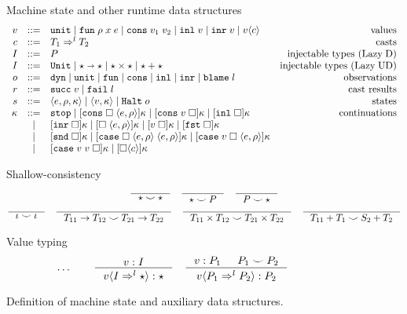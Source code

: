\documentclass[acmsmall,review,anonymous]{acmart}\settopmatter{printfolios=true,printccs=false,printacmref=false}
\newcommand{\stxrule}[3]{#1 & ::= & #3 & \text{#2}\\}
\newcommand{\stxrulecont}[1]{& | & #1 & \\}
\newcommand{\plus}[0]{+}
\newcommand{\lazyUD}{Lazy\;UD}
\newcommand{\lazyD}{Lazy\;D}
\newcommand{\sOOinspect}[3]{\langle#1,#2,#3\rangle}
\newcommand{\sOOreturn}[2]{\langle#1,#2\rangle}
\newcommand{\sOOhalt}[1]{\mathtt{Halt} \; #1}
\newcommand{\TOOdyn}[0]{\star}
\newcommand{\POOunit}[0]{\mathtt{Unit}}
\newcommand{\POOfun}[2]{#1 \shortrightarrow #2}
\newcommand{\cOOcast}[3]{#1 \Rightarrow^{#2} #3}
\newcommand{\oOOinj}{\mathtt{dyn}}
\newcommand{\oOOsole}{\mathtt{unit}}
\newcommand{\oOOfun}{\mathtt{fun}}
\newcommand{\oOOcons}{\mathtt{cons}}
\newcommand{\oOOinl}{\mathtt{inl}}
\newcommand{\oOOinr}{\mathtt{inr}}
\newcommand{\oOOblame}[1]{\mathtt{blame} \; #1}
\newcommand{\vOOcast}[2]{#1\langle#2\rangle}
\newcommand{\vOOfun}[3]{\mathtt{fun} \; #1 \; #2 \; #3}
\newcommand{\vOOtt}[0]{\mathtt{unit}}
\newcommand{\vOOcons}[2]{\mathtt{cons}\;#1\;#2}
\newcommand{\vOOinl}[1]{\mathtt{inl}\;#1}
\newcommand{\vOOinr}[1]{\mathtt{inr}\;#1}
\newcommand{\rOOsucc}[1]{\mathtt{succ}\;#1}
\newcommand{\rOOfail}[1]{\mathtt{fail}\;#1}
\newcommand{\kOOmt}[0]{\mathtt{stop}}
\newcommand{\kOOconsI}[3]{[\mathtt{cons} \; \square \; \langle#1,#2\rangle ]#3}
\newcommand{\kOOconsII}[2]{[\mathtt{cons} \; #1 \; \square]#2}
\newcommand{\kOOinl}[1]{[\mathtt{inl}\; \square]#1}
\newcommand{\kOOinr}[1]{[\mathtt{inr}\; \square]#1}
\newcommand{\kOOappI}[3]{
  [\square \; \langle#1,#2\rangle]#3
}
\newcommand{\kOOappII}[2]{
  [#1 \; \square]#2}
\newcommand{\kOOcar}[1]{[\mathtt{fst} \; \square]#1}
\newcommand{\kOOcdr}[1]{[\mathtt{snd} \; \square]#1}
\newcommand{\kOOcaseI}[4]{
  [\mathtt{case} \; \square \; \langle#1,#3\rangle \; \langle#2,#3\rangle ]#4}
\newcommand{\kOOcaseII}[4]{
  [\mathtt{case} \; #1 \; \square \; \langle#2,#3\rangle ]#4}
\newcommand{\kOOcaseIII}[3]{
  [\mathtt{case} \; #1 \; #2 \; \square]#3}
\newcommand{\kOOcast}[2]{
  [\square \langle #1 \rangle]#2}
\begin{document}
\begin{figure}
  Machine state and other runtime data structures
  \[
  \begin{array}{rclr}
  \stxrule{v}{values}{
    \vOOtt{} \mid
    \vOOfun{\rho}{x}{e} \mid
    \vOOcons{v_1}{v_2} \mid
    \vOOinl{v} \mid
    \vOOinr{v} \mid   
    \vOOcast{v}{c}
  }
  \stxrule{c}{casts}{
    \cOOcast{T_1}{l}{T_2}
  }
  \stxrule{I}{injectable types (\lazyD)}{
    P
  }
  \stxrule{I}{injectable types (\lazyUD)}{
    \POOunit \mid
    \POOfun{\star}{\star} \mid
    \star \times \star \mid
    \star + \star
  }
  \stxrule{o}{observations}{
    \oOOinj \mid
    \oOOsole \mid
    \oOOfun \mid
    \oOOcons \mid
    \oOOinl \mid
    \oOOinr \mid
    \oOOblame{l}
  }
  \stxrule{r}{cast results}{
    \rOOsucc{v} \mid
    \rOOfail{l}
  }
  \stxrule{s}{states}{
    \sOOinspect{e}{\rho}{\kappa} \mid{}
    \sOOreturn{v}{\kappa} \mid{}
    \sOOhalt{o}
  }
  \stxrule{\kappa}{continuations}{
    \kOOmt \mid
    \kOOconsI{e}{\rho}{\kappa} \mid
    \kOOconsII{v}{\kappa} \mid
    \kOOinl{\kappa}
  }
  \stxrulecont{
    \kOOinr{\kappa} \mid
    \kOOappI{e}{\rho}{\kappa} \mid
    \kOOappII{v}{\kappa} \mid
    \kOOcar{\kappa}
  }
  \stxrulecont{ 
    \kOOcdr{\kappa}\mid
    \kOOcaseI{e}{e}{\rho}{\kappa}\mid
    \kOOcaseII{v}{e}{\rho}{\kappa}
  }
  \stxrulecont{
    \kOOcaseIII{v}{v}{\kappa} \mid
    \kOOcast{c}{\kappa}
  }
  \end{array}
  \]

        Shallow-consistency
  \begin{gather*}
  \inference{}{
    \star \smile \star
  } \quad
  \inference{}{
    \star \smile P
  } \quad
  \inference{}{
    P \smile \star
  } \\
  \inference{}{
    \iota \smile \iota
  } \quad
  \inference{}{
    T_{11} \rightarrow T_{12} \smile T_{21} \rightarrow T_{22}
  } \quad
  \inference{}{
    T_{11} \times T_{12} \smile T_{21} \times T_{22}
  } \quad
  \inference{}{
  T_{11} \plus T_1 \smile S_2 \plus T_2
  }
  \end{gather*}
  
  Value typing 
  \begin{gather*}
  \dots \qquad
  \inference{
    v : I
  }{
    \vOOcast{v}{\cOOcast{I}{l}{\TOOdyn}} : \TOOdyn
  }
  \quad
  \inference{
    v : P_1 &
    P_1 \smile P_2
  }{
    \vOOcast{v}{\cOOcast{P_1}{l}{P_2}} : P_2
  }
  \end{gather*}
        \caption{Definition of machine state and auxiliary data
          structures.}
        \label{fig:state}
\end{figure}
\end{document}
